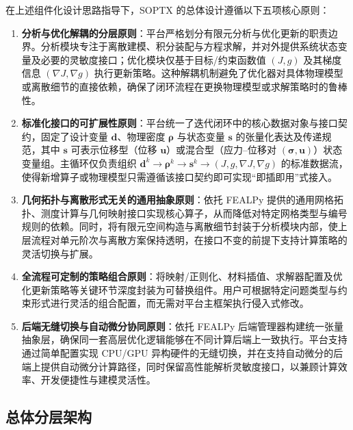 在上述组件化设计思路指导下，SOPTX 的总体设计遵循以下五项核心原则：
\begin{enumerate}[
	label={（\arabic*）},
	labelsep=0.25em,
	leftmargin=3.2em,
	itemsep=0.4em,
	topsep=0.4em,
	parsep=0pt,
	partopsep=0pt
	]
	\item \textbf{分析与优化解耦的分层原则}：平台严格划分有限元分析与优化更新的职责边界。分析模块专注于离散建模、积分装配与方程求解，并对外提供系统状态变量及必要的灵敏度接口；优化模块仅基于目标/约束函数值 $(J,g)$ 及其梯度信息 $(\nabla J,\nabla g)$ 执行更新策略。这种解耦机制避免了优化器对具体物理模型或离散细节的直接依赖，确保了闭环流程在更换物理模型或求解策略时的鲁棒性。
	
	\item \textbf{标准化接口的可扩展性原则}：平台统一了迭代闭环中的核心数据对象与接口契约，固定了设计变量 $\boldsymbol{d}$、物理密度 $\boldsymbol{\rho}$ 与状态变量 $\boldsymbol{s}$ 的张量化表达及传递规范，其中 $\boldsymbol{s}$ 可表示位移型（位移 $\boldsymbol{u}$）或混合型（应力--位移对 $(\boldsymbol{\sigma}, \boldsymbol{u})$）状态变量组。主循环仅负责组织 $\boldsymbol{d}^k \to \boldsymbol{\rho}^k \to \boldsymbol{s}^k \to (J, g, \nabla J, \nabla g)$ 的标准数据流，使得新增算子或物理模型只需遵循该接口契约即可实现“即插即用”式接入。
	
	\item \textbf{几何拓扑与离散形式无关的通用抽象原则}：依托 FEALPy 提供的通用网格拓扑、测度计算与几何映射接口实现核心算子，从而降低对特定网格类型与编号规则的依赖。同时，将有限元空间构造与离散细节封装于分析模块内部，使上层流程对单元阶次与离散方案保持透明，在接口不变的前提下支持计算策略的灵活切换与扩展。
	
	\item \textbf{全流程可定制的策略组合原则}：将映射/正则化、材料插值、求解器配置及优化更新策略等关键环节深度封装为可替换组件。用户可根据特定问题类型与约束形式进行灵活的组合配置，而无需对平台主框架执行侵入式修改。
	
	\item \textbf{后端无缝切换与自动微分协同原则}：依托 FEALPy 后端管理器构建统一张量抽象层，确保同一套高层优化逻辑能够在不同计算后端上一致执行。平台支持通过简单配置实现 CPU/GPU 异构硬件的无缝切换，并在支持自动微分的后端上提供自动微分计算路径，同时保留高性能解析灵敏度接口，以兼顾计算效率、开发便捷性与建模灵活性。
\end{enumerate}

\subsection{总体分层架构}
\label{sec:soptx_arch_layers}

